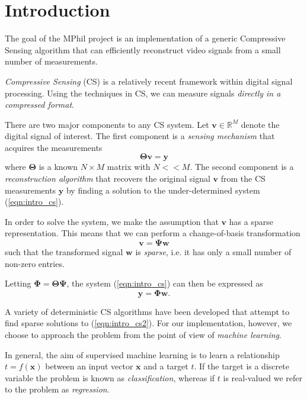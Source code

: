 \chapter{Introduction}
The goal of the MPhil project is an implementation of a generic Compressive Sensing algorithm that can efficiently reconstruct video signals from a small number of measurements.

\emph{Compressive Sensing} (CS) \cite{candes2006, donoho2006} is a relatively recent framework within digital signal processing.
Using the techniques in CS, we can measure signals \emph{directly in a compressed format}.

There are two major components to any CS system.
Let $\bm v \in\mathbb{R}^M$ denote the digital signal of interest.
The first component is a \emph{sensing mechanism} that acquires the measurements
\begin{equation}
  \label{eqn:intro_cs}
  \bm\Theta\bm v = \bm y
\end{equation}
where $\bm\Theta$ is a known $N\times M$ matrix with $N<<M$.
The second component is a \emph{reconstruction algorithm} that recovers the original signal $\bm v$ from the CS measurements $\bm y$ by finding a solution to the under-determined system (\ref{eqn:intro_cs}).

In order to solve the system, we make the assumption that $\bm v$ has a sparse representation.
This means that we can perform a change-of-basis transformation
\begin{equation}
  \label{eqn:intro_basis}
  \bm v = \bm\Psi\bm w
\end{equation}
such that the transformed signal $\bm w$ is \emph{sparse}, i.e. it has only a small number of non-zero entries.

Letting $\bm\Phi=\bm\Theta\bm\Psi$, the system (\ref{eqn:intro_cs}) can then be expressed as
\begin{equation}
  \label{eqn:intro_cs2}
  \bm y = \bm\Phi\bm w.
\end{equation}

A variety of deterministic CS algorithms have been developed that attempt to find sparse solutions to (\ref{eqn:intro_cs2}).
For our implementation, however, we choose to approach the problem from the point of view of \emph{machine learning}.

In general, the aim of supervised machine learning is to learn a relationship $t = f(\bm x)$ between an input vector $\bm x$ and a target $t$.
If the target is a discrete variable the problem is known as \emph{classification}, whereas if $t$ is real-valued we refer to the problem as \emph{regression}.

